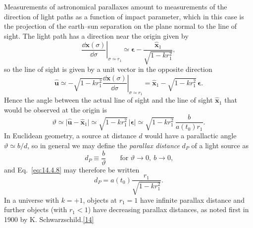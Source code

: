 Measurements of astronomical parallaxes amount to measurements of the
direction of light paths as a function of impact parameter, which in this
case is the projection of the earth--sun separation on the plane normal to
the line of sight. The light path has a direction near the origin given by
\[
  \left.
  \frac{\dd\mathbf{x}(\sigma)}{\dd\sigma}
  \right|_{\sigma\simeq r_1}
  \simeq
  \boldsymbol{\epsilon}
  -\frac{\widehat{\mathbf{x}}_1}{\sqrt{1-kr_1^2}},
\]
so the line of sight is given by a unit vector in the opposite direction
\begin{equation}
  \widehat{\mathbf{u}}
  \simeq
  -\sqrt{1-kr_1^2}
  \left.
  \frac{\dd\mathbf{x}(\sigma)}{\dd\sigma}
  \right|_{\sigma\simeq r_1}
  =
  \widehat{\mathbf{x}}_1
  -\sqrt{1-kr_1^2}\,\boldsymbol{\epsilon}.
  \tag{14.4.7}\label{eq:14.4.7}
\end{equation}
Hence the angle between the actual line of sight and the line of sight
\(\widehat{\mathbf{x}}_1\) that would be observed at the origin is
\begin{equation}
  \vartheta
  \simeq
  \lvert\widehat{\mathbf{u}}-\widehat{\mathbf{x}}_1\rvert
  \simeq
  \sqrt{1-kr_1^2}\,\lvert\boldsymbol{\epsilon}\rvert
  \simeq
  \sqrt{1-kr_1^2}\,
  \frac{b}{a(t_0)r_1}.
  \tag{14.4.8}\label{eq:14.4.8}
\end{equation}
In Euclidean geometry, a source at distance \(d\) would have a parallactic
angle \(\vartheta\simeq b/d\), so in general we may define the
\emph{parallax distance} \(d_P\) of a light source as
\begin{equation}
  d_P\equiv\frac{b}{\vartheta}
  \qquad
  \text{for \(\vartheta\to0,\ b\to0\),}
  \tag{14.4.9}\label{eq:14.4.9}
\end{equation}
and Eq.~\eqref{eq:14.4.8} may therefore be written
\begin{equation}
  d_P
  =
  a(t_0)\frac{r_1}{\sqrt{1-kr_1^2}}.
  \tag{14.4.10}\label{eq:14.4.10}
\end{equation}
In a universe with \(k=+1\), objects at \(r_1=1\) have infinite parallax
distance and further objects (with \(r_1<1\)) have decreasing parallax
distances, as noted first in 1900 by K.
Schwarzschild.\hyperref[ch14-ref-14]{[14]}

